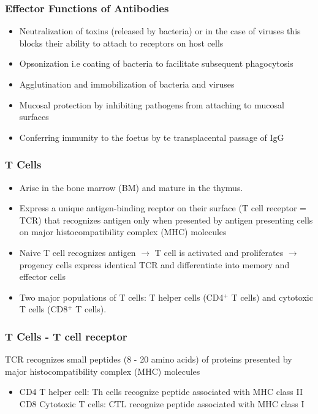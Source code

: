 \begin{itemize}
\begin{itemize}
\subsubsection{Effector Functions of Antibodies}
\begin{itemize}
    \item Neutralization of toxins (released by bacteria) or in the case of viruses this blocks their ability to attach to receptors on host cells
    \item Opsonization i.e coating of bacteria to facilitate subsequent phagocytosis
    \item Agglutination and immobilization of bacteria and viruses
    \item Mucosal protection by inhibiting pathogens from attaching to mucosal surfaces
    \item Conferring immunity to the foetus by te transplacental passage of IgG
\end{itemize}

\subsubsection{T Cells}
\begin{itemize}
    \item Arise in the bone marrow (BM) and mature in the thymus.
    \item Express a unique antigen-binding recptor on their surface (T cell receptor = TCR) that recognizes antigen only when presented by antigen presenting cells on major histocompatibility complex (MHC) molecules
    \item Naive T cell recognizes antigen $\rightarrow$ T cell is activated and proliferates $\rightarrow$ progency cells express identical TCR and differentiate into memory and effector cells
    \item Two major populations of T cells: T helper cells (CD4$^{+}$ T cells) and cytotoxic T cells (CD8$^{+}$ T cells). 
\end{itemize}
\subsubsection{T Cells - T cell receptor}
TCR recognizes small peptides (8 - 20 amino acids) of proteins presented by major histocompatibility complex (MHC) molecules
\begin{itemize}
    \item CD4 T helper cell: Th cells recognize peptide associated with MHC class II
    \ITEM CD8 Cytotoxic  T cells: CTL recognize peptide associated with MHC class I
\end{itemize}


\end{itemize}
\end{itemize}

